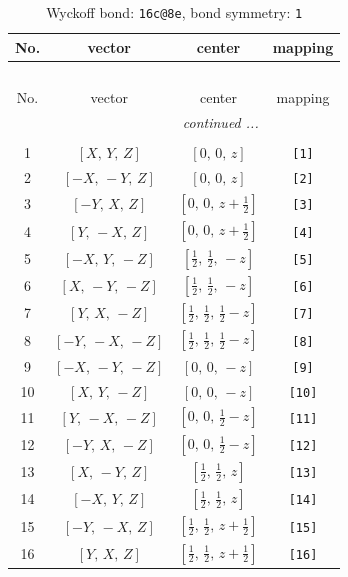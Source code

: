 \documentclass[fleqn,8pt]{jsarticle}
\begin{document}
\begin{longtable}{cccc}
\caption{Wyckoff bond: {\tt 16c@8e}, bond symmetry: {\tt 1}}
 \\
 \hline \hline
No. & vector & center & mapping \\ \hline \endfirsthead

\multicolumn{3}{l}{\tablename\ \thetable{}} \\
 \hline \hline
No. & vector & center & mapping \\ \hline \endhead

 \hline \hline
\multicolumn{3}{r}{\footnotesize\it continued ...} \\ \endfoot

 \hline \hline
\multicolumn{3}{r}{} \\ \endlastfoot

1 & $\left[ X,\, Y,\, Z \right]$ & $\left[ 0,\, 0,\, z \right]$ & {\tt [1]} \\ \hline
2 & $\left[ - X,\, - Y,\, Z \right]$ & $\left[ 0,\, 0,\, z \right]$ & {\tt [2]} \\ \hline
3 & $\left[ - Y,\, X,\, Z \right]$ & $\left[ 0,\, 0,\, z + \frac{1}{2} \right]$ & {\tt [3]} \\ \hline
4 & $\left[ Y,\, - X,\, Z \right]$ & $\left[ 0,\, 0,\, z + \frac{1}{2} \right]$ & {\tt [4]} \\ \hline
5 & $\left[ - X,\, Y,\, - Z \right]$ & $\left[ \frac{1}{2},\, \frac{1}{2},\, - z \right]$ & {\tt [5]} \\ \hline
6 & $\left[ X,\, - Y,\, - Z \right]$ & $\left[ \frac{1}{2},\, \frac{1}{2},\, - z \right]$ & {\tt [6]} \\ \hline
7 & $\left[ Y,\, X,\, - Z \right]$ & $\left[ \frac{1}{2},\, \frac{1}{2},\, \frac{1}{2} - z \right]$ & {\tt [7]} \\ \hline
8 & $\left[ - Y,\, - X,\, - Z \right]$ & $\left[ \frac{1}{2},\, \frac{1}{2},\, \frac{1}{2} - z \right]$ & {\tt [8]} \\ \hline
9 & $\left[ - X,\, - Y,\, - Z \right]$ & $\left[ 0,\, 0,\, - z \right]$ & {\tt [9]} \\ \hline
10 & $\left[ X,\, Y,\, - Z \right]$ & $\left[ 0,\, 0,\, - z \right]$ & {\tt [10]} \\ \hline
11 & $\left[ Y,\, - X,\, - Z \right]$ & $\left[ 0,\, 0,\, \frac{1}{2} - z \right]$ & {\tt [11]} \\ \hline
12 & $\left[ - Y,\, X,\, - Z \right]$ & $\left[ 0,\, 0,\, \frac{1}{2} - z \right]$ & {\tt [12]} \\ \hline
13 & $\left[ X,\, - Y,\, Z \right]$ & $\left[ \frac{1}{2},\, \frac{1}{2},\, z \right]$ & {\tt [13]} \\ \hline
14 & $\left[ - X,\, Y,\, Z \right]$ & $\left[ \frac{1}{2},\, \frac{1}{2},\, z \right]$ & {\tt [14]} \\ \hline
15 & $\left[ - Y,\, - X,\, Z \right]$ & $\left[ \frac{1}{2},\, \frac{1}{2},\, z + \frac{1}{2} \right]$ & {\tt [15]} \\ \hline
16 & $\left[ Y,\, X,\, Z \right]$ & $\left[ \frac{1}{2},\, \frac{1}{2},\, z + \frac{1}{2} \right]$ & {\tt [16]} \\
\end{longtable}
\end{document}
